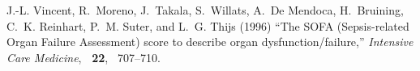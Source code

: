 \documentclass{bioinfo}
\begin{document}
\begin{thebibliography}{}
J.-L. Vincent, R.~Moreno, J.~Takala, S.~Willats, A.~{De Mendoca}, H.~Bruining,
  C.~K. Reinhart, P.~M. Suter, and L.~G. Thijs (1996) ``{The SOFA (Sepsis-related
  Organ Failure Assessment) score to describe organ dysfunction/failure},''
  {\em Intensive Care Medicine}, {\bf ~22}, ~707--710.









\end{thebibliography}
\end{document}
